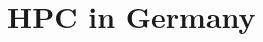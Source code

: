 \documentclass[10pt,aspectratio=169,notheorems]{beamer}
\begin{document}







\section{HPC in Germany}
\end{document}
